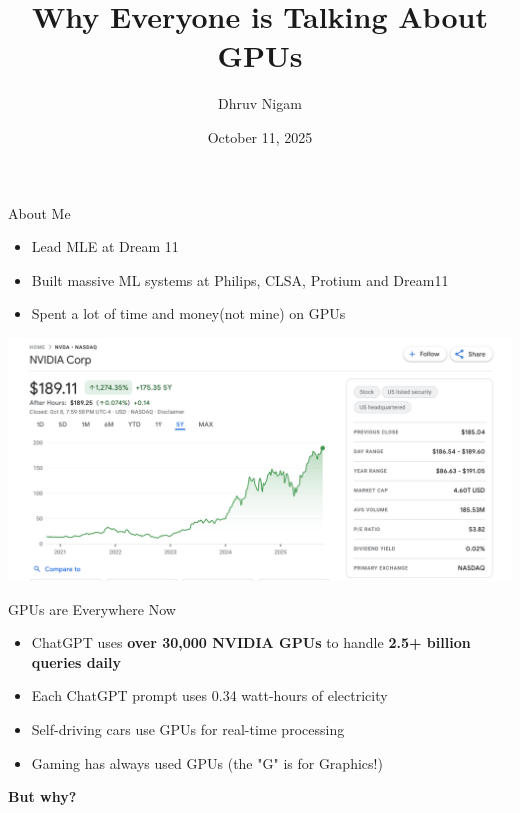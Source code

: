 \documentclass[10pt]{beamer}
\title{Why Everyone is Talking About GPUs}
\date{October 11, 2025}
\author{Dhruv Nigam}
\institute{MumPy Meetup}
\begin{document}
\maketitle

\begin{frame}{About Me}
  \begin{itemize}
    \item Lead MLE at Dream 11
    \item Built massive ML systems at Philips, CLSA, Protium and Dream11
    \item Spent a lot of time and money(not mine) on GPUs
  \end{itemize}
  
\end{frame}

\begin{frame}[plain]
  \begin{center}
    \includegraphics[width=1.0\textwidth,height=1.2\textheight,keepaspectratio]{images/nvidia_stock.png}
  \end{center}
\end{frame}

\begin{frame}{GPUs are Everywhere Now}
  \begin{itemize}
    \item ChatGPT uses \textbf{over 30,000 NVIDIA GPUs} to handle \textbf{2.5+ billion queries daily}
    \item Each ChatGPT prompt uses 0.34 watt-hours of electricity
    \item Self-driving cars use GPUs for real-time processing
    \item Gaming has always used GPUs (the "G" is for Graphics!)
  \end{itemize}
  
  \vspace{1em}
  \Large \textbf{But why?}
\end{frame}
\end{document}
